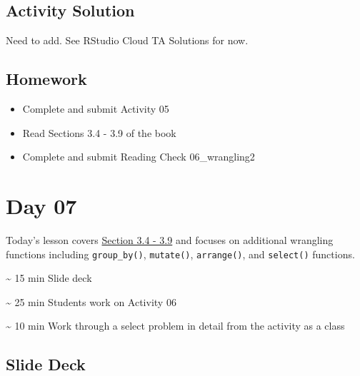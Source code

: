\documentclass[
  letterpaper,
  DIV=11,
  numbers=noendperiod]{scrreprt}
\begin{document}
\hypertarget{activity-solution-4}{%
\section*{Activity Solution}\label{activity-solution-4}}

Need to add. See RStudio Cloud TA Solutions for now.

\hypertarget{homework-5}{%
\section*{Homework}\label{homework-5}}

\begin{itemize}
\item
  Complete and submit Activity 05
\item
  Read Sections 3.4 - 3.9 of the book
\item
  Complete and submit Reading Check 06\_wrangling2
\end{itemize}


\hypertarget{day-07}{%
\chapter*{Day 07}\label{day-07}}

Today's lesson covers
\href{https://nustat.github.io/intro-stat-data-sci/03-wrangling.html}{Section
3.4 - 3.9} and focuses on additional wrangling functions including
\texttt{group\_by()}, \texttt{mutate()}, \texttt{arrange()}, and
\texttt{select()} functions.

\begin{tcolorbox}[enhanced jigsaw, colframe=quarto-callout-note-color-frame, breakable, colback=white, toprule=.15mm, leftrule=.75mm, title={Agenda}, left=2mm, coltitle=black, bottomtitle=1mm, bottomrule=.15mm, rightrule=.15mm, colbacktitle=quarto-callout-note-color!10!white, opacitybacktitle=0.6, opacityback=0, toptitle=1mm, arc=.35mm, titlerule=0mm]
\textasciitilde{} 15 min Slide deck

\textasciitilde{} 25 min Students work on Activity 06

\textasciitilde{} 10 min Work through a select problem in detail from
the activity as a class
\end{tcolorbox}

\hypertarget{slide-deck-6}{%
\section*{Slide Deck}\label{slide-deck-6}}
\end{document}
